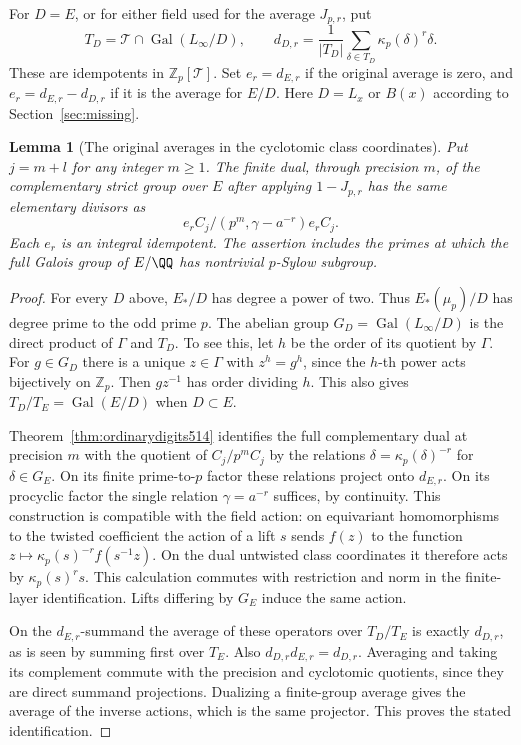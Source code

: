 \documentclass[a4paper,11pt]{article}
\newtheorem{lemma}[proposition]{Lemma}
\theoremstyle{definition}
\theoremstyle{remark}
\newcommand{\ZZ}{\mathbb Z}\newcommand{\ord}{\operatorname{ord}}
\numberwithin{equation}{section}
\begin{document}
For \(D=E\), or for either field used for the average
\(J_{p,r}\), put
\[
 T_D=\mathcal T\cap\operatorname{Gal}(L_\infty/D),\qquad
 d_{D,r}=\frac{1}{|T_D|}\sum_{\delta\in T_D}
                              \kappa_p(\delta)^r\delta .
\]
These are idempotents in \(\ZZ_p[\mathcal T]\).
Set \(e_r=d_{E,r}\) if the original average is zero, and
\(e_r=d_{E,r}-d_{D,r}\) if it is the average for \(E/D\).
Here \(D=L_x\) or \(B(x)\) according to
Section~\ref{sec:missing}.

\begin{lemma}[The original averages in the cyclotomic class coordinates]
\leavevmode\label{lem:averages649}
Put \(j=m+l\) for any integer \(m\ge1\).
The finite dual, through precision \(m\), of the complementary
strict group over \(E\) after applying \(1-J_{p,r}\) has the
same elementary divisors as
\[
             e_r C_j/(p^m,\gamma-a^{-r})e_r C_j.
\]
Each \(e_r\) is an integral idempotent. The assertion includes
the primes at which the full Galois group of \(E/\QQ\) has
nontrivial \(p\)-Sylow subgroup.
\end{lemma}
\begin{proof}
For every \(D\) above, \(E_*/D\) has degree a power of two.
Thus \(E_*(\mu_p)/D\) has degree prime to the odd prime
\(p\). The abelian group \(G_D=\operatorname{Gal}(L_\infty/D)\)
is the direct product of \(\Gamma\) and \(T_D\). To see this,
let \(h\) be the order of its quotient by \(\Gamma\).
For \(g\in G_D\) there is a unique \(z\in\Gamma\) with
\(z^h=g^h\), since the \(h\)-th power acts bijectively
on \(\ZZ_p\). Then \(gz^{-1}\) has order dividing \(h\).
This also gives \(T_D/T_E=\operatorname{Gal}(E/D)\) when
\(D\subset E\).

Theorem~\ref{thm:ordinarydigits514} identifies the full
complementary dual at precision \(m\) with the quotient of
\(C_j/p^m C_j\) by the relations
\(\delta=\kappa_p(\delta)^{-r}\) for \(\delta\in G_E\).
On its finite prime-to-\(p\) factor these relations project
onto \(d_{E,r}\). On its procyclic factor the single relation
\(\gamma=a^{-r}\) suffices, by continuity. This construction
is compatible with the field action: on equivariant
homomorphisms to the twisted coefficient the action of a
lift \(s\) sends \(f(z)\) to the function
\(z\mapsto\kappa_p(s)^{-r} f(s^{-1}z)\). On the dual
untwisted class coordinates it therefore acts by
\(\kappa_p(s)^r s\). This calculation commutes with
restriction and norm in the finite-layer identification.
Lifts differing by \(G_E\) induce the same action.

On the \(d_{E,r}\)-summand the average of these operators over
\(T_D/T_E\) is exactly \(d_{D,r}\), as is seen by summing
first over \(T_E\). Also \(d_{D,r}d_{E,r}=d_{D,r}\).
Averaging and taking its complement commute with the
precision and cyclotomic quotients, since they are direct
summand projections. Dualizing a finite-group average gives
the average of the inverse actions, which is the same
projector. This proves the stated identification.
\end{proof}
\end{document}
